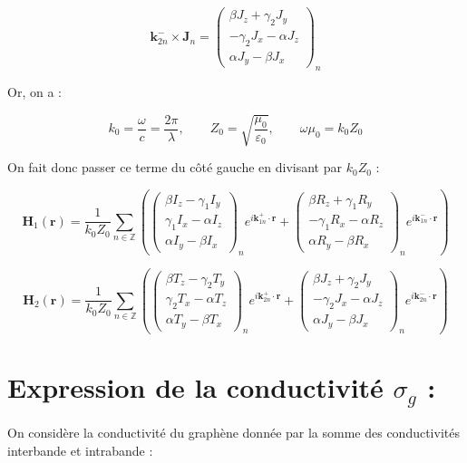 \documentclass{article}
\begin{document}
\[
\mathbf{k}_{2n}^{-} \times \mathbf{J}_n =
\begin{pmatrix}
\beta J_{z} + \gamma_2 J_{y} \\
- \gamma_2 J_{x} - \alpha J_{z} \\
\alpha J_{y} - \beta J_{x}
\end{pmatrix}_n
\]

Or, on a :

\[
k_0 = \frac{\omega}{c} = \frac{2\pi}{\lambda}, \qquad
Z_0 = \sqrt{\frac{\mu_0}{\varepsilon_0}}, \qquad
\omega \mu_0 = k_0 Z_0
\]

On fait donc passer ce terme du côté gauche en divisant par \( k_0 Z_0 \) :

\[
\mathbf{H}_1(\mathbf{r}) = \frac{1}{k_0 Z_0} \sum_{n \in \mathbb{Z}} 
\left(
\begin{pmatrix}
\beta I_{z} - \gamma_1 I_{y} \\
\gamma_1 I_{x} - \alpha I_{z} \\
\alpha I_{y} - \beta I_{x}
\end{pmatrix}_n
e^{i \mathbf{k}_{1n}^{+} \cdot \mathbf{r}} +
\begin{pmatrix}
\beta R_{z} + \gamma_1 R_{y} \\
- \gamma_1 R_{x} - \alpha R_{z} \\
\alpha R_{y} - \beta R_{x}
\end{pmatrix}_n
e^{i \mathbf{k}_{1n}^{-} \cdot \mathbf{r}}
\right)
\]

\[
\mathbf{H}_2(\mathbf{r}) = \frac{1}{k_0 Z_0} \sum_{n \in \mathbb{Z}} 
\left(
\begin{pmatrix}
\beta T_{z} - \gamma_2 T_{y} \\
\gamma_2 T_{x} - \alpha T_{z} \\
\alpha T_{y} - \beta T_{x}
\end{pmatrix}_n
e^{i \mathbf{k}_{2n}^{+} \cdot \mathbf{r}} +
\begin{pmatrix}
\beta J_{z} + \gamma_2 J_{y} \\
- \gamma_2 J_{x} - \alpha J_{z} \\
\alpha J_{y} - \beta J_{x}
\end{pmatrix}_n
e^{i \mathbf{k}_{2n}^{-} \cdot \mathbf{r}}
\right)
\]



\section*{Expression de la conductivité \( \sigma_g \) :}

On considère la conductivité du graphène donnée par la somme des conductivités interbande et intrabande :
\end{document}
